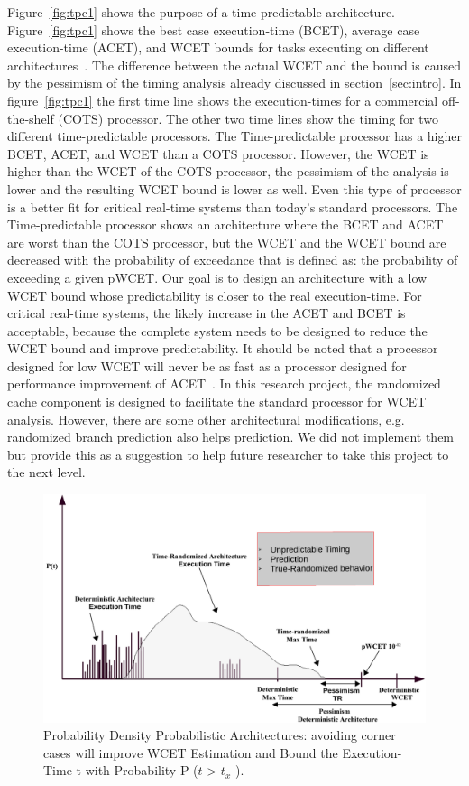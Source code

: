 Figure~\ref{fig:tpc1} shows the purpose of a time-predictable architecture. Figure~\ref{fig:tpc1} shows the best case execution-time (BCET), average case execution-time (ACET), and WCET bounds for tasks executing on different architectures~\cite{schoeberl2009time}. The difference between the actual WCET and the bound is caused by the pessimism of the timing analysis already discussed in section~\ref{sec:intro}. In figure~\ref{fig:tpc1} the first time line shows the execution-times for a commercial off-the-shelf (COTS) processor. The other two time lines show the timing for two different time-predictable processors.
The Time-predictable processor has a higher BCET, ACET, and WCET than a
COTS processor. However, the WCET is higher than the WCET of the COTS processor, the
pessimism of the analysis is lower and the resulting WCET bound is lower as well. Even this type of
processor is a better fit for critical real-time systems than today’s standard processors.
The Time-predictable processor shows an architecture where the BCET and ACET are worst than the COTS processor, but the
WCET and the WCET bound are decreased with the probability of exceedance that is defined as: the probability of exceeding a given pWCET. Our goal is to design an architecture with a low WCET
bound whose predictability is closer to the real execution-time. For critical real-time systems, the likely increase in the ACET and BCET is acceptable, because
the complete system needs to be designed to reduce the WCET bound and improve predictability. It should be noted that a processor
designed for low WCET will never be as fast as a processor designed for performance improvement of ACET~\cite{schoeberl2009time}. In this research project, the randomized cache component is designed to facilitate the  standard processor for WCET analysis. However, there are some other architectural modifications, e.g. randomized branch prediction also helps prediction. We did not implement them but provide this as a suggestion to help future researcher to take this project to the next level.

\begin{figure}[tb!]

   \includegraphics[scale=0.77]{figures/pta-new-crop.pdf}
   \caption{Probability Density Probabilistic Architectures: avoiding corner cases will
improve WCET Estimation and Bound the Execution-Time t with Probability P ($t$ > $t_x$ ).}
\label{fig:prb}
\end{figure}


